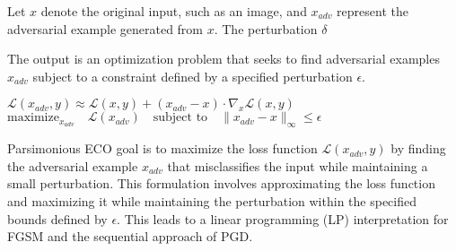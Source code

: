 Let \( x \) denote the original input, such as an image, and \( x_{adv} \) represent the adversarial example generated from \( x \). The perturbation \( \delta \)

The output is an optimization problem that seeks to find adversarial examples \( x_{adv} \) subject to a constraint defined by a specified perturbation \( \epsilon \).

$\mathcal{L}(x_{adv}, y) \approx \mathcal{L}(x, y) + (x_{adv} - x) \cdot \nabla_x \mathcal{L}(x, y)$
$\text{maximize}_{x_{adv}} \quad \mathcal{L}(x_{adv}) \quad \text{subject to} \quad \|x_{adv} - x\|_\infty \leq \epsilon$

Parsimonious ECO goal is to maximize the loss function \( \mathcal{L}(x_{adv}, y) \) by finding the adversarial example \( x_{adv} \) that misclassifies the input while maintaining a small perturbation. This formulation involves approximating the loss function and maximizing it while maintaining the perturbation within the specified bounds defined by \( \epsilon \). This leads to a linear programming (LP) interpretation for FGSM and the sequential approach of PGD.
